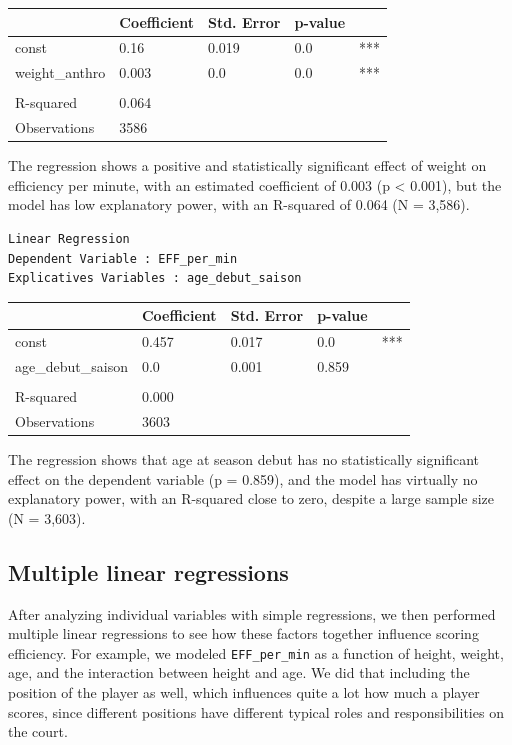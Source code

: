 \documentclass[
  letterpaper,
  DIV=11,
  numbers=noendperiod]{scrartcl}
\begin{document}
\begin{longtable}[]{@{}lllll@{}}
\toprule\noalign{}
& Coefficient & Std. Error & p-value & \\
\midrule\noalign{}
\endhead
\bottomrule\noalign{}
\endlastfoot
const & 0.16 & 0.019 & 0.0 & *** \\
weight\_anthro & 0.003 & 0.0 & 0.0 & *** \\
& & & & \\
R-squared & 0.064 & & & \\
Observations & 3586 & & & \\
\end{longtable}

The regression shows a positive and statistically significant effect of
weight on efficiency per minute, with an estimated coefficient of 0.003
(p \textless{} 0.001), but the model has low explanatory power, with an
R-squared of 0.064 (N = 3,586).

\begin{verbatim}
Linear Regression
Dependent Variable : EFF_per_min
Explicatives Variables : age_debut_saison
\end{verbatim}

\begin{longtable}[]{@{}lllll@{}}
\toprule\noalign{}
& Coefficient & Std. Error & p-value & \\
\midrule\noalign{}
\endhead
\bottomrule\noalign{}
\endlastfoot
const & 0.457 & 0.017 & 0.0 & *** \\
age\_debut\_saison & 0.0 & 0.001 & 0.859 & \\
& & & & \\
R-squared & 0.000 & & & \\
Observations & 3603 & & & \\
\end{longtable}

The regression shows that age at season debut has no statistically
significant effect on the dependent variable (p = 0.859), and the model
has virtually no explanatory power, with an R-squared close to zero,
despite a large sample size (N = 3,603).

\subsection{Multiple linear
regressions}\label{multiple-linear-regressions}

After analyzing individual variables with simple regressions, we then
performed multiple linear regressions to see how these factors together
influence scoring efficiency. For example, we modeled
\texttt{EFF\_per\_min} as a function of height, weight, age, and the
interaction between height and age. We did that including the position
of the player as well, which influences quite a lot how much a player
scores, since different positions have different typical roles and
responsibilities on the court.
\end{document}
